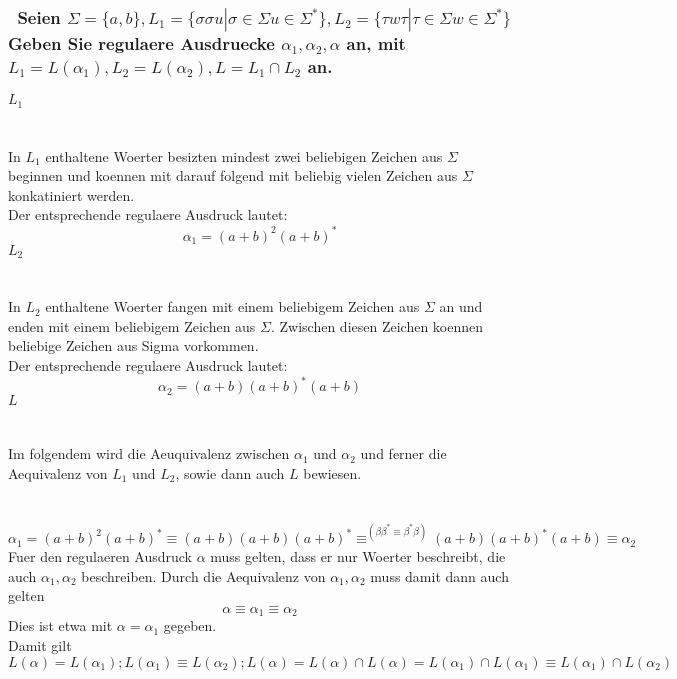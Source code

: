 \documentclass{article}
\newcommand{\gap}{\null\ \\ \\}
\newcommand{\task}[1]{\textbf{#1} \\ \gap}
\begin{document}
\subsubsection{\
    Seien $\Sigma = \{a,b\} 
        , L_1 = \{\sigma\sigma u | \sigma \in \Sigma u \in \Sigma^*\}
        , L_2 = \{\tau w \tau | \tau \in \Sigma w \in \Sigma^*\}$\\
    Geben Sie regulaere Ausdruecke $\alpha_1,\alpha_2,\alpha$ an, mit
        $L_1 = L(\alpha_1), L_2 = L(\alpha_2), L = L_1 \cap L_2$ an.
    }
\task{$L_1$}
In $L_1$ enthaltene Woerter besizten mindest zwei beliebigen Zeichen aus 
    $\Sigma$ beginnen und koennen mit darauf folgend mit beliebig vielen
    Zeichen aus $\Sigma$ konkatiniert werden.\\
Der entsprechende regulaere Ausdruck lautet:\[
    \alpha_1 = (a+b)^2 (a+b)^*
    \]
\task{$L_2$}
In $L_2$ enthaltene Woerter fangen mit einem beliebigem Zeichen aus $\Sigma$ an
    und enden mit einem beliebigem Zeichen aus $\Sigma$. Zwischen diesen Zeichen
    koennen beliebige Zeichen aus Sigma vorkommen.\\
Der entsprechende regulaere Ausdruck lautet:\[
    \alpha_2 = (a+b)(a+b)^*(a+b)
    \]
\task{$L$}
Im folgendem wird die Aeuquivalenz zwischen $\alpha_1$ und $\alpha_2$ und ferner
    die Aequivalenz von $L_1$ und $L_2$, sowie dann auch $L$ bewiesen.\\
\gap
\[
    \alpha_1 = (a+b)^2(a+b)^*
        \equiv (a+b)(a+b)(a+b)^*
        \equiv^{(\beta \beta^* \equiv \beta^* \beta)} 
            (a+b)(a+b)^*(a+b)
        \equiv \alpha_2
    \]
Fuer den regulaeren Ausdruck $\alpha$ muss gelten, dass er nur Woerter
    beschreibt, die auch $\alpha_1,\alpha_2$ beschreiben. Durch die Aequivalenz
    von $\alpha_1,\alpha_2$ muss damit dann auch gelten\[
    \alpha \equiv \alpha_1 \equiv \alpha_2
    \]
Dies ist etwa mit $\alpha = \alpha_1$ gegeben.\\
Damit gilt \[
    L(\alpha) = L(\alpha_1);
    L(\alpha_1) \equiv L(\alpha_2);
    L(\alpha )= L(\alpha) \cap L(\alpha)
        = L(\alpha_1) \cap L(\alpha_1)
        \equiv L(\alpha_1) \cap L(\alpha_2) 
    \]
\end{document}
